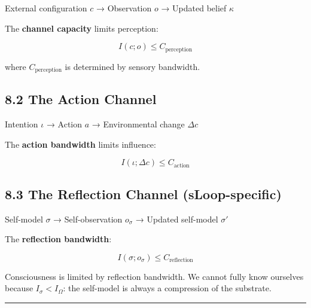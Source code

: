 \documentclass[
  11pt,
  letterpaper,
  twoside,
  openright]{book}
\begin{document}
External configuration \(c\) → Observation \(o\) → Updated belief
\(\kappa\)

The \textbf{channel capacity} limits perception:

\[I(c; o) \leq C_{\text{perception}}\]

where \(C_{\text{perception}}\) is determined by sensory bandwidth.

\subsection{8.2 The Action Channel}\label{the-action-channel}

Intention \(\iota\) → Action \(a\) → Environmental change \(\Delta c\)

The \textbf{action bandwidth} limits influence:

\[I(\iota; \Delta c) \leq C_{\text{action}}\]

\subsection{8.3 The Reflection Channel
(sLoop-specific)}\label{the-reflection-channel-sloop-specific}

Self-model \(\sigma\) → Self-observation \(o_\sigma\) → Updated
self-model \(\sigma'\)

The \textbf{reflection bandwidth}:

\[I(\sigma; o_\sigma) \leq C_{\text{reflection}}\]

\begin{tcolorbox}[enhanced jigsaw, coltitle=black, colbacktitle=quarto-callout-important-color!10!white, toprule=.15mm, colframe=quarto-callout-important-color-frame, arc=.35mm, opacityback=0, bottomtitle=1mm, toptitle=1mm, breakable, colback=white, titlerule=0mm, opacitybacktitle=0.6, title=\textcolor{quarto-callout-important-color}{\faExclamation}\hspace{0.5em}{The sLoop Bottleneck}, rightrule=.15mm, bottomrule=.15mm, leftrule=.75mm, left=2mm]

Consciousness is limited by reflection bandwidth. We cannot fully know
ourselves because \(I_\sigma < I_\Omega\): the self-model is always a
compression of the substrate.

\end{tcolorbox}

\begin{center}\rule{0.5\linewidth}{0.5pt}\end{center}
\end{document}
